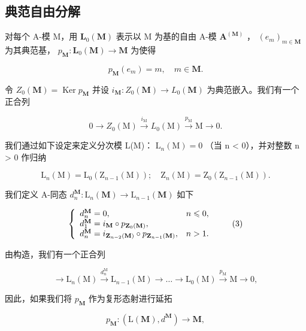 \subsection{典范自由分解}

对每个 A-模 M，用 \(\mathbf{L}_{0}(\mathbf{M})\) 表示以 M 为基的自由 A-模 \(\mathbf{A}^{(\mathbf{M})}\) ， \((e_{m})_{m\in\mathbf{M}}\) 为其典范基， \(p_{\mathbf{M}}:\mathbf{L}_{0}(\mathbf{M})\to\mathbf{M}\) 为使得

\[
p _ {\mathbf {M}} (e _ {m}) = m, \quad m \in \mathbf {M}.
\]

令 \(Z_0(\mathbf{M}) = \operatorname{Ker} p_{\mathbf{M}}\) 并设 \(i_{\mathbf{M}}: Z_0(\mathbf{M}) \to L_0(\mathbf{M})\) 为典范嵌入。我们有一个正合列

\[
0 \longrightarrow Z _ {0} (\mathrm{M}) \stackrel {i _ {\mathrm{M}}} {\longrightarrow} L _ {0} (\mathrm{M}) \stackrel {p _ {\mathrm{M}}} {\longrightarrow} \mathrm{M} \longrightarrow 0.\tag{1}
\]

我们通过如下设定来定义分次模 L(M)： \(\mathrm{L}_{n}(\mathrm{M}) = 0\) （当 n \textless{} 0），并对整数 n \textgreater{} 0 作归纳

\[
\mathrm{L} _ {n} (\mathrm{M}) = \mathrm{L} _ {0} \left(\mathrm{Z} _ {n - 1} (\mathrm{M})\right); \quad \mathrm{Z} _ {n} (\mathrm{M}) = \mathrm{Z} _ {0} \left(\mathrm{Z} _ {n - 1} (\mathrm{M})\right).\tag{2}
\]

我们定义 A-同态 \(d_{n}^{\mathbf{M}}:\mathrm{L}_{n}(\mathbf{M})\to \mathrm{L}_{n - 1}(\mathbf{M})\) 如下

\[
\left\{ \begin{array}{l l} d _ {n} ^ {\mathbf {M}} = 0, & n \leqslant 0, \\ d _ {1} ^ {\mathbf {M}} = i _ {\mathbf {M}} \circ p _ {\mathbf {Z} _ {0} (\mathbf {M})}, & \\ d _ {n} ^ {\mathbf {M}} = i _ {\mathbf {Z} _ {n - 2} (\mathbf {M})} \circ p _ {\mathbf {Z} _ {n - 1} (\mathbf {M})}, & n > 1. \end{array} \right.\tag{3}
\]

由构造，我们有一个正合列

\[
\longrightarrow \mathrm{L} _ {n} (\mathrm{M}) \xrightarrow {d _ {n} ^ {\mathrm{M}}} \mathrm{L} _ {n - 1} (\mathrm{M}) \longrightarrow \dots \longrightarrow \mathrm{L} _ {0} (\mathrm{M}) \xrightarrow {p _ {\mathrm{M}}} \mathrm{M} \longrightarrow 0,
\]

因此，如果我们将 \(p_{\mathbf{M}}\) 作为复形态射进行延拓

\[
p _ {\mathbf {M}}: (\mathrm{L} (\mathbf {M}), d ^ {\mathbf {M}}) \rightarrow \mathbf {M},
\]

